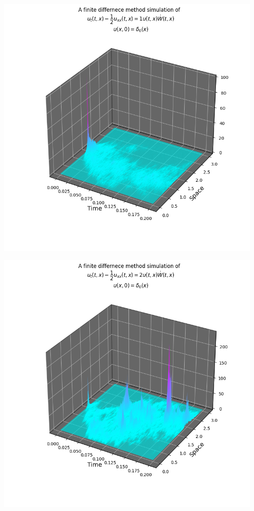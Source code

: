 \documentclass{beamer}%
\numberwithin{equation}{section}
\begin{document}
\begin{frame}
	\centering
	\includegraphics[scale=.5]{SHEdeltaNoise1.png}
\end{frame}

\begin{frame}
	\centering
	\includegraphics[scale=.5]{SHEdeltaNoise2.png}
\end{frame}
\end{document}
